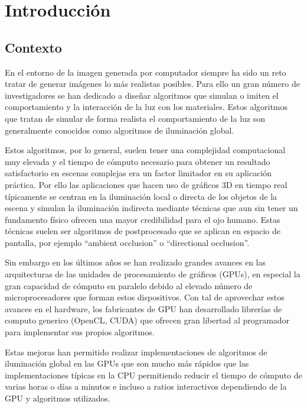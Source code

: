 \chapter{Introducción}

\section{Contexto}

En el entorno de la imagen generada por computador siempre ha sido un reto tratar de generar imágenes lo más realistas posibles. Para ello un gran número de investigadores se han dedicado a diseñar algoritmos que simulan o imiten el comportamiento y la interacción de la luz con los materiales. Estos algoritmos que tratan de simular de forma realista el comportamiento de la luz son generalmente conocidos como algoritmos de iluminación global.

Estos algoritmos, por lo general, suelen tener una complejidad computacional muy elevada y el tiempo de cómputo necesario para obtener un resultado satisfactorio en escenas complejas era un factor limitador en su aplicación práctica. Por ello las aplicaciones que hacen uso de gráficos 3D en tiempo real típicamente se centran en la iluminación local o directa de los objetos de la escena y simulan la iluminación indirecta mediante técnicas que aun sin tener un fundamento físico ofrecen una mayor credibilidad para el ojo humano. Estas técnicas suelen ser algoritmos de postprocesado que se aplican en espacio de pantalla, por ejemplo “ambient occlusion” o “directional occlusion”. 

Sin embargo en los últimos años se han realizado grandes avances en las arquitecturas de las unidades de procesamiento de gráficos (GPUs), en especial la gran capacidad de cómputo en paralelo debido al elevado número de microprocesadores que forman estos dispositivos. Con tal de aprovechar estos avances en el hardware, los fabricantes de GPU han desarrollado librerías de computo generico (OpenCL, CUDA) que ofrecen gran libertad al programador para implementar sus propios algoritmos.

Estas mejoras han permitido realizar implementaciones de algoritmos de iluminación global en las GPUs que son mucho más rápidos que las implementaciones típicas en la CPU permitiendo reducir el tiempo de cómputo de varias horas o días a minutos e incluso a ratios interactivos dependiendo de la GPU y algoritmos utilizados.

\clearpage

